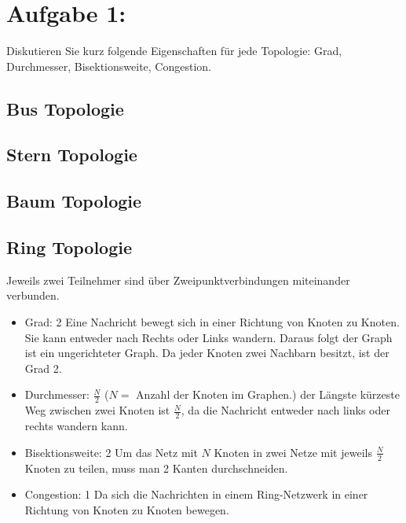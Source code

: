 \section{Aufgabe 1:}
Diskutieren Sie kurz folgende Eigenschaften für jede Topologie: Grad, Durchmesser, Bisektionsweite, Congestion.
\subsection{Bus Topologie}
\subsection{Stern Topologie}
\subsection{Baum Topologie}
\subsection{Ring Topologie}
 Jeweils zwei Teilnehmer sind über Zweipunktverbindungen miteinander verbunden.
\begin{itemize}
  \item Grad: 2
  \newline Eine Nachricht bewegt sich in einer Richtung von Knoten zu Knoten. Sie kann entweder nach Rechts oder Links wandern. Daraus folgt der Graph ist ein ungerichteter Graph. Da jeder Knoten zwei Nachbarn besitzt, ist der Grad 2.
  \item Durchmesser: $\frac{N}{2}$ ($N =$ Anzahl der Knoten im Graphen.)
   \newline der Längste kürzeste Weg zwischen zwei Knoten ist $\frac{N}{2}$, da die Nachricht entweder nach links oder rechts wandern kann.
  \item Bisektionsweite: 2
  \newline  Um das Netz mit $N$ Knoten in zwei Netze mit jeweils $\frac{N}{2}$ Knoten zu teilen, muss man 2 Kanten durchschneiden.
  \item Congestion: 1
  \newline Da sich die Nachrichten in einem Ring-Netzwerk in einer Richtung von Knoten zu Knoten bewegen.   
\end{itemize}

